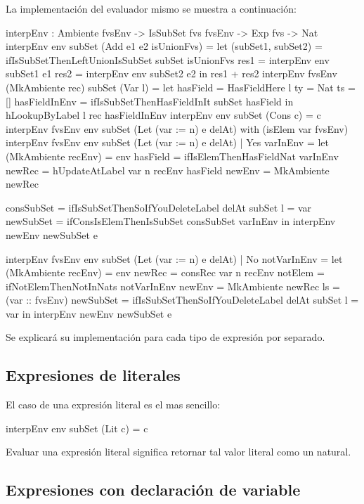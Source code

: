 La implementación del evaluador mismo se muestra a continuación:

\begin{code}
interpEnv : Ambiente fvsEnv -> IsSubSet fvs fvsEnv -> Exp fvs -> Nat
interpEnv env subSet (Add e1 e2 isUnionFvs) = 
  let (subSet1, subSet2) = 
        ifIsSubSetThenLeftUnionIsSubSet subSet isUnionFvs
      res1 = interpEnv env subSet1 e1
      res2 = interpEnv env subSet2 e2
  in res1 + res2
interpEnv {fvsEnv} (MkAmbiente rec) subSet (Var l) = 
  let hasField = HasFieldHere {l} {ty = Nat} {ts = []}
      hasFieldInEnv = ifIsSubSetThenHasFieldInIt  subSet hasField
  in hLookupByLabel l rec hasFieldInEnv
interpEnv env subSet (Cons c) = c
interpEnv {fvsEnv} env subSet (Let (var := n) e delAt) 
    with (isElem var fvsEnv)
  interpEnv {fvsEnv} env subSet (Let (var := n) e delAt) 
    | Yes varInEnv = 
    let
        (MkAmbiente recEnv) = env
        hasField = ifIsElemThenHasFieldNat varInEnv 
        newRec = hUpdateAtLabel var n recEnv hasField
        newEnv = MkAmbiente newRec
        
        consSubSet = 
          ifIsSubSetThenSoIfYouDeleteLabel delAt subSet {l = var}
        newSubSet = ifConsIsElemThenIsSubSet consSubSet varInEnv
    in interpEnv newEnv newSubSet e
    
  interpEnv {fvsEnv} env subSet (Let (var := n) e delAt) 
    | No notVarInEnv = 
    let (MkAmbiente recEnv) = env
        newRec = consRec var n recEnv
          {notElem = ifNotElemThenNotInNats notVarInEnv}
        newEnv = MkAmbiente newRec {ls = (var :: fvsEnv)}
        newSubSet = 
          ifIsSubSetThenSoIfYouDeleteLabel delAt subSet {l = var}
    in interpEnv newEnv newSubSet e
\end{code}

Se explicará su implementación para cada tipo de expresión por separado.

\subsection{Expresiones de literales}

El caso de una expresión literal es el mas sencillo:

\begin{code}
interpEnv env subSet (Lit c) = c
\end{code}

Evaluar una expresión literal significa retornar tal valor literal como un natural.

\subsection{Expresiones con declaración de variable}

